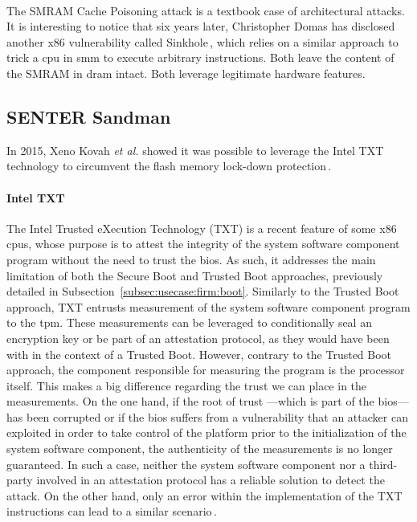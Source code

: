 \paragraph{}
%
The SMRAM Cache Poisoning attack is a textbook case of architectural attacks.
%
It is interesting to notice that six years later, Christopher Domas has
disclosed another x86 vulnerability called Sinkhole\,\cite{domas2015sinkhole},
which relies on a similar approach to trick a \ac{cpu} in \ac{smm} to execute
arbitrary instructions.
%
Both leave the content of the SMRAM in \ac{dram} intact.
%
Both leverage legitimate hardware features.

\subsection{SENTER Sandman}
\label{subsec:usecase:hse:sandman}

In 2015, Xeno Kovah \emph{et al.} showed it was possible to leverage the Intel TXT
technology to circumvent the flash memory lock-down
protection\,\cite{kovah2015senter}.

\paragraph{Intel TXT}
%
The Intel Trusted eXecution Technology (TXT)\cite{intel2015txt} is a recent
feature of some x86 \acp{cpu}, whose purpose is to attest the integrity of the
system software component program without the need to trust the \ac{bios}.
%
As such, it addresses the main limitation of both the Secure Boot and Trusted
Boot approaches, previously detailed in
Subsection~\ref{subsec:usecase:firm:boot}.
%
Similarly to the Trusted Boot approach, TXT entrusts measurement of the system
software component program to the \ac{tpm}.
%
These measurements can be leveraged to conditionally seal an encryption key or
be part of an attestation protocol, as they would have been with in the context
of a Trusted Boot.
%
However, contrary to the Trusted Boot approach, the component responsible for
measuring the program is the processor itself.
%
This makes a big difference regarding the trust we can place in the
measurements.
%
On the one hand, if the root of trust ---which is part of the \ac{bios}--- has
been corrupted or if the \ac{bios} suffers from a vulnerability that an attacker
can exploited in order to take control of the platform prior to the
initialization of the system software component, the authenticity of the
measurements is no longer guaranteed.
%
In such a case, neither the system software component nor a third-party involved
in an attestation protocol has a reliable solution to detect the attack.
%
On the other hand, only an error within the implementation of the TXT
instructions can lead to a similar scenario\,\cite{wojtczuk2011txtbug}.

